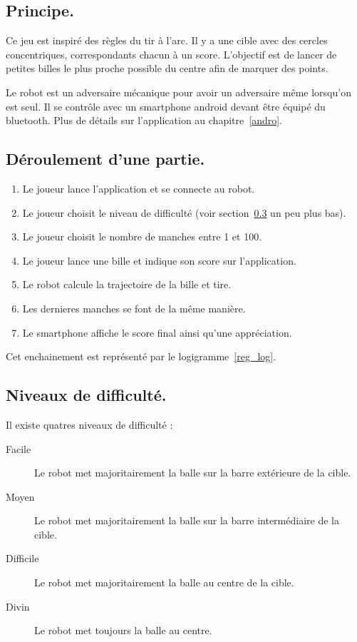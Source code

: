 \subsection{Principe.}

Ce jeu est inspiré des règles du tir à l'arc. Il y a une cible avec des cercles concentriques, correspondants chacun à un score. L'objectif est de lancer de petites billes le plus proche possible du centre afin de marquer des points.

Le robot est un adversaire mécanique pour avoir un adversaire même lorsqu'on est seul. Il se contrôle avec un smartphone android devant être équipé du bluetooth. Plus de détails sur l'application au chapitre~\ref{andro}.

\subsection{Déroulement d'une partie.}
\begin{enumerate}
	\item Le joueur lance l'application et se connecte au robot.
	\item Le joueur choisit le niveau de difficulté (voir section~\ref{reg_dif} un peu plus bas).
	\item Le joueur choisit le nombre de manches entre 1 et 100.
	\item Le joueur lance une bille et indique son score sur l'application.
	\item Le robot calcule la trajectoire de la bille et tire.
	\item Les dernieres manches se font de la même manière.
	\item Le smartphone affiche le score final ainsi qu'une appréciation.
\end{enumerate}

Cet enchainement est représenté par le logigramme~\ref{reg_log}.

\subsection{Niveaux de difficulté.} \label{reg_dif}
Il existe quatres niveaux de difficulté : \begin{description}
	\item[Facile] Le robot met majoritairement la balle sur la barre extérieure de la cible.
	\item[Moyen] Le robot met majoritairement la balle sur la barre intermédiaire de la cible.
	\item[Difficile] Le robot met majoritairement la balle au centre de la cible.
	\item[Divin] Le robot met toujours la balle au centre.
\end{description}

